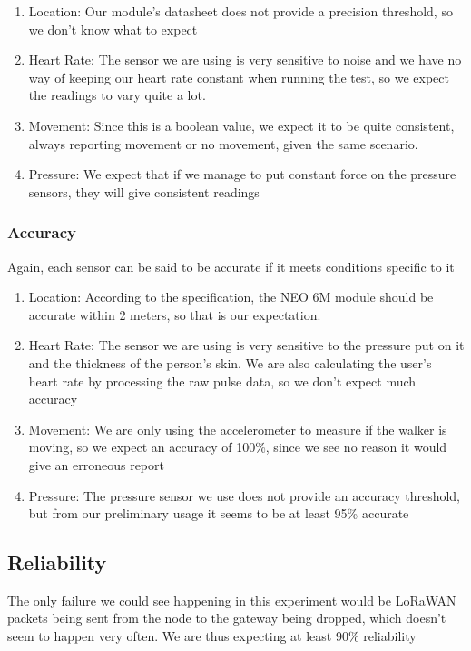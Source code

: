 			\begin{enumerate}
				\item Location: Our module's datasheet does not provide a precision threshold, so we don't know what to expect
				\item Heart Rate: The sensor we are using is very sensitive to noise and we have no way of keeping our heart rate constant when running the test, so we expect the readings to vary quite a lot.
				\item Movement: Since this is a boolean value, we expect it to be quite consistent, always reporting movement or no movement, given the same scenario.
				\item Pressure: We expect that if we manage to put constant force on the pressure sensors, they will give consistent readings
			\end{enumerate}

		\subsubsection{Accuracy}
			Again, each sensor can be said to be accurate if it meets conditions specific to it 

			\begin{enumerate}
				\item Location: According to the specification, the NEO 6M module should be accurate within 2 meters, so that is our expectation.
				\item Heart Rate: The sensor we are using is very sensitive to the pressure put on it and the thickness of the person's skin. We are also calculating the user's heart rate by processing the raw pulse data, so we don't expect much accuracy
				\item Movement: We are only using the accelerometer to measure if the walker is moving, so we expect an accuracy of 100\%, since we see no reason it would give an erroneous report
				\item Pressure: The pressure sensor we use does not provide an accuracy threshold, but from our preliminary usage it seems to be at least 95\% accurate
			\end{enumerate}

		\subsection{Reliability}
			The only failure we could see happening in this experiment would be LoRaWAN packets being sent from the node to the gateway being dropped, which doesn't seem to happen very often. We are thus expecting at least 90\% reliability


